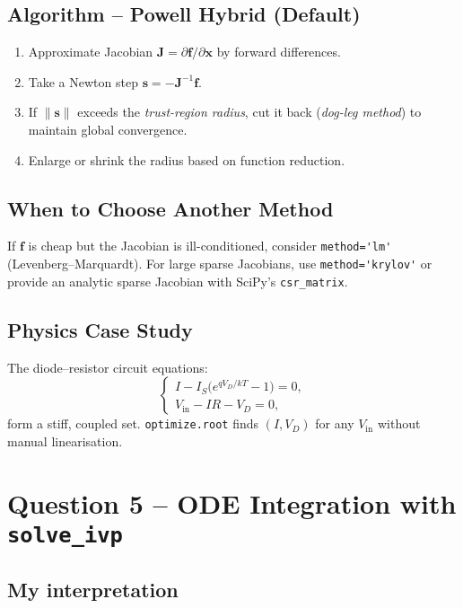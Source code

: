 \documentclass[a4paper,11pt]{article}
\begin{document}
\subsection{Algorithm – Powell Hybrid (Default)}
\begin{enumerate}
  \item Approximate Jacobian $\mathbf J=\partial\mathbf f/\partial\mathbf x$ by forward differences.
  \item Take a Newton step $\mathbf s=-\mathbf J^{-1}\mathbf f$.
  \item If $\|\mathbf s\|$ exceeds the \emph{trust-region radius}, cut it back (\emph{dog-leg method}) to maintain global convergence.
  \item Enlarge or shrink the radius based on function reduction.
\end{enumerate}

\subsection{When to Choose Another Method}
If $\mathbf f$ is cheap but the Jacobian is ill-conditioned, consider \lstinline|method='lm'| (Levenberg–Marquardt).  
For large sparse Jacobians, use \lstinline|method='krylov'| or provide an analytic sparse Jacobian with SciPy’s \texttt{csr\_matrix}.

\subsection{Physics Case Study}
The diode–resistor circuit equations:
\[
  \begin{cases}
     I - I_S\!\bigl(e^{qV_D/kT}-1\bigr) = 0,\\
     V_{\text{in}} - IR - V_D           = 0,
  \end{cases}
\]
form a stiff, coupled set.  \lstinline|optimize.root| finds $(I, V_D)$ for any $V_{\text{in}}$ without manual linearisation.

\section{Question 5 – ODE Integration with \texttt{solve\_ivp}}
\subsection{My interpretation}  
\end{document}

